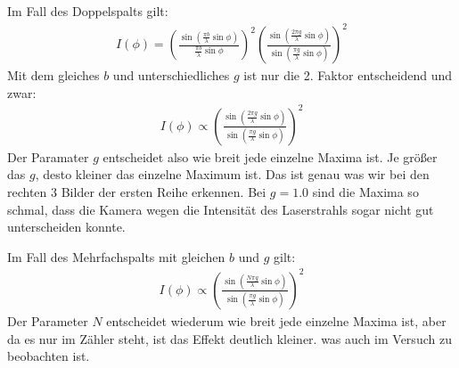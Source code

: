 		Im Fall des Doppelspalts gilt:
		\begin{align}
			I(\phi) = 
				\left(\frac{\sin\left(\frac{\pi b}{\lambda} \sin\phi\right)}{\frac{\pi b}{\lambda} \sin\phi}\right)^2
				\left(\frac{\sin\left(\frac{2\pi g}{\lambda} \sin\phi\right)}{\sin\left(\frac{\pi g}{\lambda} \sin\phi\right)}\right)^2
		\end{align}
		Mit dem gleiches $b$ und unterschiedliches $g$ ist nur die 2. Faktor entscheidend und zwar:
		\begin{align}
			I(\phi) \propto
				\left(\frac{\sin\left(\frac{2\pi g}{\lambda} \sin\phi\right)}{\sin\left(\frac{\pi g}{\lambda} \sin\phi\right)}\right)^2
		\end{align}
		Der Paramater $g$ entscheidet also wie breit jede einzelne Maxima ist. Je größer das $g$, desto kleiner das einzelne Maximum ist. Das ist genau was wir bei den rechten 3 Bilder der ersten Reihe erkennen. Bei $g=\num{1,0}$ sind die Maxima so schmal, dass die Kamera wegen die Intensität des Laserstrahls sogar nicht gut unterscheiden konnte. 

		Im Fall des Mehrfachspalts mit gleichen $b$ und $g$ gilt:
		\begin{align}
			I(\phi) \propto
				\left(\frac{\sin\left(\frac{N\pi g}{\lambda} \sin\phi\right)}{\sin\left(\frac{\pi g}{\lambda} \sin\phi\right)}\right)^2
		\end{align}
		Der Parameter $N$ entscheidet wiederum wie breit jede einzelne Maxima ist, aber da es nur im Zähler steht, ist das Effekt deutlich kleiner. was auch im Versuch zu beobachten ist. 

